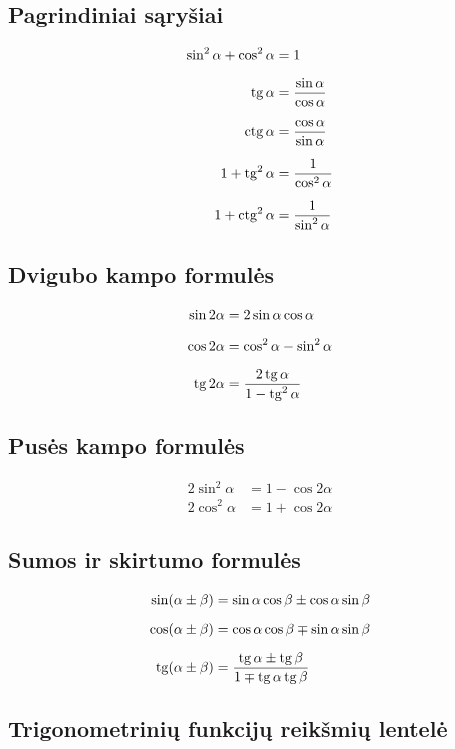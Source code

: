 \subsection{Pagrindiniai sąryšiai}

\begin{align}
\sin^2\alpha + \cos^2\alpha &= 1 \\[6pt]
\operatorname{tg}\alpha   &= \frac{\sin\alpha}{\cos\alpha} \\[6pt]
\operatorname{ctg}\alpha  &= \frac{\cos\alpha}{\sin\alpha} \\[6pt]
1 + \operatorname{tg}^2\alpha  &= \frac{1}{\cos^2\alpha} \\[6pt]
1 + \operatorname{ctg}^2\alpha &= \frac{1}{\sin^2\alpha}
\end{align}

\subsection{Dvigubo kampo formulės}

\begin{align}
\sin 2\alpha &= 2\sin\alpha\cos\alpha \\[6pt]
\cos 2\alpha &= \cos^2\alpha - \sin^2\alpha \\[6pt]
\operatorname{tg} 2\alpha  &= \frac{2\operatorname{tg}\alpha}{1-\operatorname{tg}^2\alpha}
\end{align}

\subsection{Pusės kampo formulės}

\begin{align}
2\sin^2\alpha &= 1 - \cos 2\alpha \\[6pt]
2\cos^2\alpha &= 1 + \cos 2\alpha
\end{align}

\subsection{Sumos ir skirtumo formulės}

\begin{align}
\sin(\alpha \pm \beta) &= \sin\alpha\cos\beta \pm \cos\alpha\sin\beta \\[6pt]
\cos(\alpha \pm \beta) &= \cos\alpha\cos\beta \mp \sin\alpha\sin\beta \\[6pt]
\operatorname{tg}(\alpha \pm \beta)  &= \frac{\operatorname{tg}\alpha \pm \operatorname{tg}\beta}{1 \mp \operatorname{tg}\alpha\operatorname{tg}\beta}
\end{align}

\subsection{Trigonometrinių funkcijų reikšmių lentelė}


